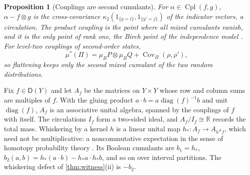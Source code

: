 \documentclass[11pt]{article}
\newtheorem{proposition}[theorem]{Proposition}
\theoremstyle{definition}
\theoremstyle{remark}
\newcommand{\D}{\mathsf{D}}
\newcommand{\Cpl}{\operatorname{Cpl}}
\begin{document}
\begin{proposition}[Couplings are second cumulants]\label{prop:kappa2}
For $\alpha\in\Cpl(f,g)$, $\alpha-f\otimes g$ is the cross-covariance $\kappa_2(1_{\{y=i\}},1_{\{y'=j\}})$ of the indicator vectors, a
circulation. The product coupling is the point where all mixed cumulants vanish, and it is the only point of
rank one, the Birch point of the independence model \cite{PachterSturmfels2005}. For level-two couplings of
second-order states,
\[
\mu^*(\Pi)=\mu_BP\otimes\mu_BQ+\operatorname{Cov}_\Pi(\rho,\rho'),
\]
so flattening keeps only the second mixed cumulant of the two random distributions.
\end{proposition}

Fix $f\in\D(Y)$ and let $A_f$ be the matrices on $Y\times Y$ whose row and column sums are multiples of $f$. With the
gluing product $a\cdot b=a\operatorname{diag}(f)^{-1}b$ and unit $\operatorname{diag}(f)$, $A_f$ is an associative unital algebra, spanned by
the couplings of $f$ with itself. The circulations $I_f$ form a two-sided ideal, and $A_f/I_f\cong\mathbb R$ records the total
mass. Whiskering by a kernel $h$ is a linear unital map $h_*\colon A_f\to A_{h^\#f}$, which need not be multiplicative: a
noncommutative expectation in the sense of homotopy probability theory \cite{HPT1,HPT2}. Its Boolean cumulants
\cite{SpeicherWoroudi1997} are $b_1=h_*$, $b_2(a,b)=h_*(a\cdot b)-h_*a\cdot h_*b$, and so on over interval partitions. The
whiskering defect of \cref{thm:witness}(ii) is $-b_2$.
\end{document}

